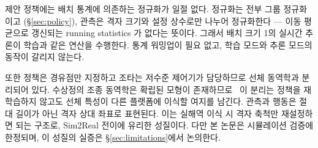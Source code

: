 제안 정책에는 배치 통계에 의존하는 정규화가 일절 없다. 정규화는 전부 그룹 정규화이고
(\S\ref{sec:policy}), 관측은 격자 크기와 설정 상수로만 나누어 정규화한다 --- 이동 평균으로
갱신되는 running statistics 가 없다는 뜻이다. 그래서 배치 크기 1의 실시간 추론이 학습과 같은
연산을 수행한다. 통계 워밍업이 필요 없고, 학습 모드와 추론 모드의 동작이 갈리지 않는다.

또한 정책은 경유점만 지정하고 조타는 저수준 제어기가 담당하므로 선체 동역학과 분리되어
있다. 수상정의 조종 동역학은 확립된 모형이 존재하므로~\citep{fossen2011marine} 이 분리는
정책을 재학습하지 않고도 선체 특성이 다른 플랫폼에 이식할 여지를 남긴다. 관측과 행동은
절대 길이가 아닌 격자 상대 좌표로 표현된다. 이는 실해역 이식 시
격자 축척만 재설정하면 되는 구조로, Sim2Real 전이에 유리한 성질이다. 다만 본 논문은
시뮬레이션 검증에 한정되며, 이 성질의 실증은 \S\ref{sec:limitations}에서 논의한다.
